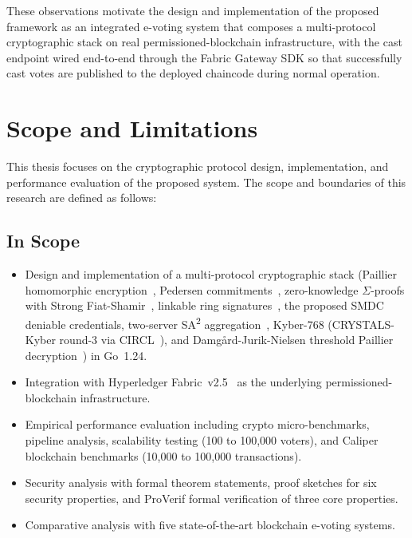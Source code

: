 These observations motivate the design and implementation of the proposed framework as an integrated e-voting system that composes a multi-protocol cryptographic stack on real permissioned-blockchain infrastructure, with the cast endpoint wired end-to-end through the Fabric Gateway SDK so that successfully cast votes are published to the deployed chaincode during normal operation.

\section{Scope and Limitations}
\label{sec:scope}

This thesis focuses on the cryptographic protocol design, implementation, and performance evaluation of the proposed system. The scope and boundaries of this research are defined as follows:

\subsection{In Scope}
\begin{itemize}
    \item Design and implementation of a multi-protocol cryptographic stack (Paillier homomorphic encryption~\cite{paillier1999}, Pedersen commitments~\cite{pedersen1991}, zero-knowledge $\Sigma$-proofs with Strong Fiat-Shamir~\cite{bernhard2012}, linkable ring signatures~\cite{liu2004}, the proposed SMDC deniable credentials, two-server SA\textsuperscript{2} aggregation~\cite{sa2_apple}, Kyber-768 (CRYSTALS-Kyber round-3 via CIRCL~\cite{nist_kyber}), and Damg\aa rd-Jurik-Nielsen threshold Paillier decryption~\cite{damgard2010}) in Go~1.24.
    \item Integration with Hyperledger Fabric~v2.5~\cite{androulaki2018} as the underlying permissioned-blockchain infrastructure.
    \item Empirical performance evaluation including crypto micro-benchmarks, pipeline analysis, scalability testing (100 to 100,000 voters), and Caliper blockchain benchmarks (10,000 to 100,000 transactions).
    \item Security analysis with formal theorem statements, proof sketches for six security properties, and ProVerif formal verification of three core properties.
    \item Comparative analysis with five state-of-the-art blockchain e-voting systems.
\end{itemize}

